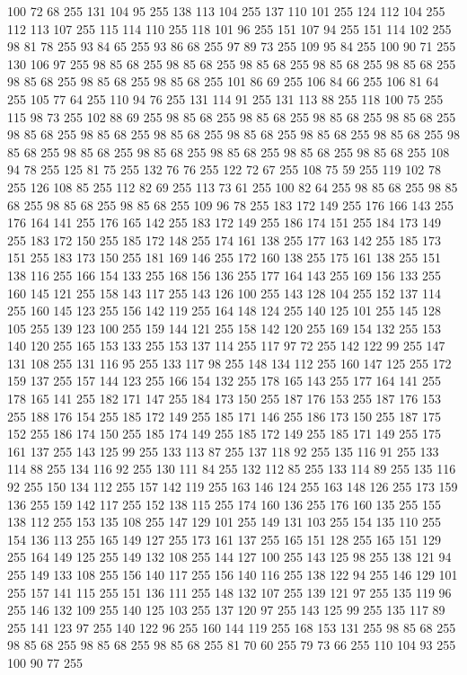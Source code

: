 100 72 68 255 131 104 95 255 138 113 104 255 137 110 101 255 124 112 104 255 112 113 107 255 115 114 110 255 118 101 96 255 151 107 94 255 151 114 102 255 98 81 78 255 93 84 65 255 93 86 68 255 97 89 73 255 109 95 84 255 100 90 71 255 130 106 97 255 98 85 68 255 98 85 68 255 98 85 68 255 98 85 68 255 98 85 68 255 98 85 68 255 98 85 68 255 98 85 68 255 101 86 69 255 106 84 66 255 106 81 64 255 105 77 64 255 110 94 76 255 131 114 91 255 131 113 88 255 118 100 75 255 115 98 73 255 102 88 69 255 98 85 68 255 98 85 68 255 98 85 68 255 98 85 68 255 98 85 68 255 98 85 68 255 98 85 68 255 98 85 68 255 98 85 68 255 98 85 68 255 98 85 68 255 98 85 68 255 98 85 68 255 98 85 68 255 98 85 68 255 98 85 68 255 108 94 78 255 125 81 75 255 132 76 76 255 122 72 67 255 108 75 59 255 119 102 78 255 126 108 85 255 112 82 69 255 113 73 61 255 100 82 64 255 98 85 68 255 98 85 68 255 98 85 68 255
98 85 68 255 109 96 78 255 183 172 149 255 176 166 143 255 176 164 141 255 176 165 142 255 183 172 149 255 186 174 151 255 184 173 149 255 183 172 150 255 185 172 148 255 174 161 138 255 177 163 142 255 185 173 151 255 183 173 150 255 181 169 146 255 172 160 138 255 175 161 138 255 151 138 116 255 166 154 133 255 168 156 136 255 177 164 143 255 169 156 133 255 160 145 121 255 158 143 117 255 143 126 100 255 143 128 104 255 152 137 114 255 160 145 123 255 156 142 119 255 164 148 124 255 140 125 101 255 145 128 105 255 139 123 100 255 159 144 121 255 158 142 120 255 169 154 132 255 153 140 120 255 165 153 133 255 153 137 114 255 117 97 72 255 142 122 99 255 147 131 108 255 131 116 95 255 133 117 98 255 148 134 112 255 160 147 125 255 172 159 137 255 157 144 123 255 166 154 132 255 178 165 143 255 177 164 141 255 178 165 141 255 182 171 147 255 184 173 150 255 187 176 153 255 187 176 153 255 188 176 154 255 185 172 149 255 185 171 146 255 186 173 150 255 187 175 152 255 186 174 150 255 185 174 149 255
185 172 149 255 185 171 149 255 175 161 137 255 143 125 99 255 133 113 87 255 137 118 92 255 135 116 91 255 133 114 88 255 134 116 92 255 130 111 84 255 132 112 85 255 133 114 89 255 135 116 92 255 150 134 112 255 157 142 119 255 163 146 124 255 163 148 126 255 173 159 136 255 159 142 117 255 152 138 115 255 174 160 136 255 176 160 135 255 155 138 112 255 153 135 108 255 147 129 101 255 149 131 103 255 154 135 110 255 154 136 113 255 165 149 127 255 173 161 137 255 165 151 128 255 165 151 129 255 164 149 125 255 149 132 108 255 144 127 100 255 143 125 98 255 138 121 94 255 149 133 108 255 156 140 117 255 156 140 116 255 138 122 94 255 146 129 101 255 157 141 115 255 151 136 111 255 148 132 107 255 139 121 97 255 135 119 96 255 146 132 109 255 140 125 103 255 137 120 97 255 143 125 99 255 135 117 89 255 141 123 97 255 140 122 96 255 160 144 119 255 168 153 131 255 98 85 68 255 98 85 68 255 98 85 68 255 98 85 68 255 81 70 60 255 79 73 66 255 110 104 93 255 100 90 77 255
